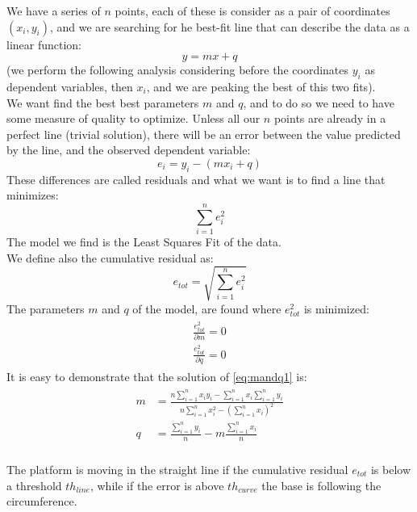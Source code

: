 We have a series of $n$ points, each of these is consider as a pair of coordinates $(x_i,y_i)$, and we are searching for he best-fit line that can describe the data as a linear function:  $$y = mx + q$$ 
(we perform the following analysis considering before the coordinates $y_i$ as dependent variables, then $x_i$, and we are peaking the best of this two fits). \\
We want find the best best parameters $m$ and $q$, and to do so we need to have some measure of quality to optimize. Unless all our $n$ points are already in a perfect line (trivial solution), there will be an error between the value predicted by the line, and the observed dependent variable:
$$e_i = y_i - (mx_i + q)$$
These differences are called residuals and what we want is to find a line that minimizes: 
$$\sum_{i=1}^{n}{e_i^2}$$
The model we find is the Least Squares Fit of the data. \\ %
We define also the cumulative residual as: $$e_{tot} = \sqrt{\sum_{i=1}^{n}{e_i^2}}$$
The parameters $m$ and $q$ of the model, are found where $e_{tot}^2$ is minimized:
\begin{align}
\begin{split}
\frac{e_{tot}^2}{\partial m} = 0\\
\frac{e_{tot}^2}{\partial q} = 0
\end{split}
\label{eq:mandq1}
\end{align}
It is easy to demonstrate that the solution of \ref{eq:mandq1} is:
\begin{align}
\begin{split}
m &= \frac{n\sum_{i=1}^{n}{x_iy_i} - \sum_{i=1}^{n}{x_i}\sum_{i=1}^{n}{y_i}}{n\sum_{i=1}^{n}{x_i^2} -( \sum_{i=1}^{n}{x_i})^2} \\
q &= \frac{ \sum_{i=1}^{n}{y_i}}{n} - m\frac{ \sum_{i=1}^{n}{x_i}}{n}\\
\end{split}
\label{eq:mandq}
\end{align}

The platform is moving in the straight line if the cumulative residual $e_{tot}$ is below a threshold $th_{line}$, while if the error is above $th_{curve}$ the base is following the circumference.\\

